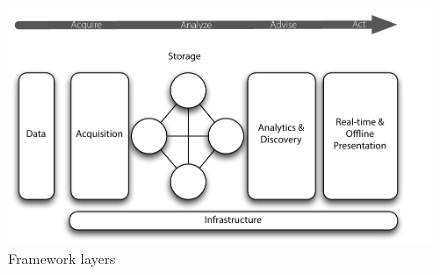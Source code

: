 \begin{figure}[!htbp]
    \centering
    \includegraphics[scale=.62]{framework_layers}
    \caption{Framework layers}
    \label{layers}
\end{figure}
